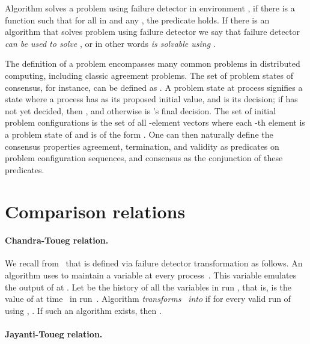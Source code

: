\documentclass[11pt]{article}
\begin{document}
Algorithm  solves a problem  using failure detector
      in environment , if there is a function   such
     that for all  in  and any ,  the predicate  holds.
If there is an algorithm that solves problem  using failure
     detector  we say that failure detector~ \emph{can be used
     to solve} , or in other words  \emph{is
     solvable using} .

\medskip

The definition of a problem encompasses many common problems in distributed computing, including classic agreement problems.
The set of problem states of consensus, for instance, can be defined
     as . A problem state  at process  signifies a state where a process  has
      as its proposed initial value, and  is its decision; if  has not yet decided, then 
     , and otherwise  is 's final decision.
The set of initial problem configurations  is the set of
     all -element vectors where each -th element is a problem state of  and is of the form .
One can then naturally define the consensus properties agreement,
     termination, and validity as predicates on problem configuration
     sequences, and consensus as the conjunction of these predicates.



\section{Comparison relations}\label{sec:comparisonRelations}

\paragraph{Chandra-Toueg relation.}  

We recall from~\cite{chan:ufdfr,chan:twfdf1} that  is
     defined via failure detector transformation as follows.
An  algorithm  uses  to maintain a
     variable  at every process~.
This variable emulates the output of  at .
Let  be the history of all the  variables in run
     , that is,  is the value of  at
     time~ in run~.
Algorithm  \emph{transforms}~
     \emph{into}  if for every valid run  of  using ,
     .
If such an algorithm  exists, then .

\paragraph{Jayanti-Toueg relation.}  
\end{document}
